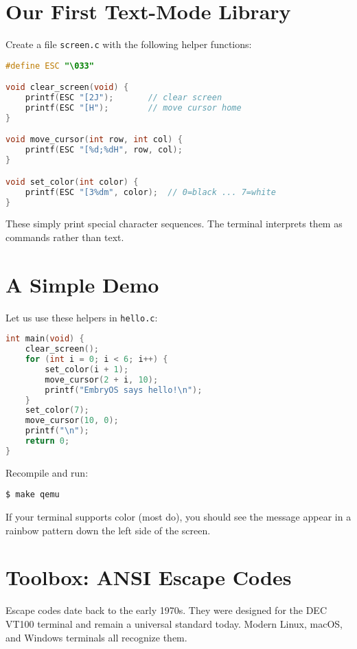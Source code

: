 \section{Our First Text-Mode Library}

Create a file \texttt{screen.c} with the following helper functions:

\begin{lstlisting}[style=oscode,language=C,caption={Minimal text-mode screen library},label={lst:screen_c}]
#define ESC "\033"

void clear_screen(void) {
    printf(ESC "[2J");       // clear screen
    printf(ESC "[H");        // move cursor home
}

void move_cursor(int row, int col) {
    printf(ESC "[%d;%dH", row, col);
}

void set_color(int color) {
    printf(ESC "[3%dm", color);  // 0=black ... 7=white
}
\end{lstlisting}

\noindent
These simply print special character sequences.  The terminal interprets them
as commands rather than text.

\section{A Simple Demo}

Let us use these helpers in \texttt{hello.c}:

\begin{lstlisting}[style=oscode,language=C,caption={Colored "Hello" in text mode},label={lst:hello_text}]
int main(void) {
    clear_screen();
    for (int i = 0; i < 6; i++) {
        set_color(i + 1);
        move_cursor(2 + i, 10);
        printf("EmbryOS says hello!\n");
    }
    set_color(7);
    move_cursor(10, 0);
    printf("\n");
    return 0;
}
\end{lstlisting}

Recompile and run:
\begin{verbatim}
$ make qemu
\end{verbatim}

If your terminal supports color (most do), you should see the message appear in
a rainbow pattern down the left side of the screen.

\section{Toolbox: ANSI Escape Codes}

Escape codes date back to the early 1970s.  They were designed for the DEC
VT100 terminal and remain a universal standard today.  Modern Linux, macOS,
and Windows terminals all recognize them.

